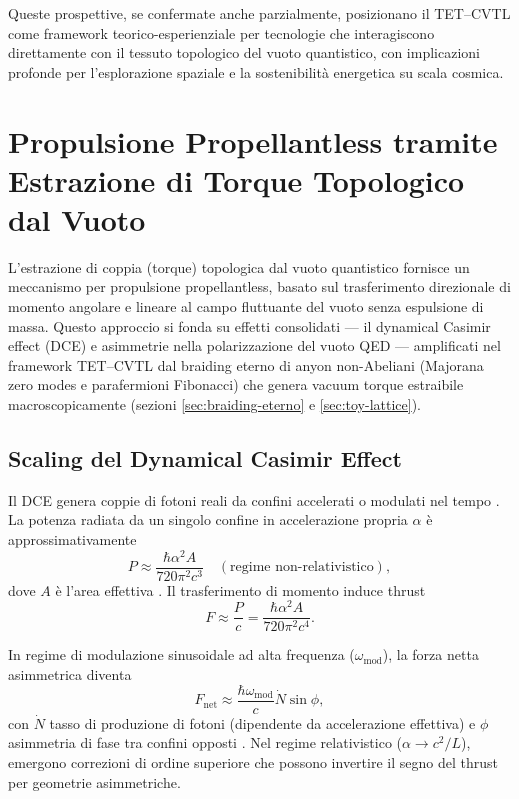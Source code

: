 \documentclass[11pt,a4paper]{article}
\let\oldcite\cite
\renewcommand{\cite}{\protect\oldcite}
\let\oldref\ref
\renewcommand{\ref}{\protect\oldref}
\theoremstyle{plain}
\theoremstyle{definition}
\begin{document}
\vspace{0.3cm}

Queste prospettive, se confermate anche parzialmente, posizionano il TET--CVTL come framework teorico-esperienziale per tecnologie che interagiscono direttamente con il tessuto topologico del vuoto quantistico, con implicazioni profonde per l'esplorazione spaziale e la sostenibilità energetica su scala cosmica.




\section{Propulsione Propellantless tramite Estrazione di Torque Topologico dal Vuoto}
\label{sec:propellantless-vacuum-torque}

L'estrazione di coppia (torque) topologica dal vuoto quantistico fornisce un meccanismo per propulsione propellantless, basato sul trasferimento direzionale di momento angolare e lineare al campo fluttuante del vuoto senza espulsione di massa. Questo approccio si fonda su effetti consolidati — il dynamical Casimir effect (DCE) e asimmetrie nella polarizzazione del vuoto QED — amplificati nel framework TET--CVTL dal braiding eterno di anyon non-Abeliani (Majorana zero modes e parafermioni Fibonacci) che genera vacuum torque estraibile macroscopicamente (sezioni \ref{sec:braiding-eterno} e \ref{sec:toy-lattice}).

\subsection{Scaling del Dynamical Casimir Effect}

Il DCE genera coppie di fotoni reali da confini accelerati o modulati nel tempo \cite{Moore1970, Wilson2011}. La potenza radiata da un singolo confine in accelerazione propria $\alpha$ è approssimativamente
\begin{equation}
P \approx \frac{\hbar \alpha^2 A}{720 \pi^2 c^3} \quad (\text{regime non-relativistico}),
\label{eq:dce_power}
\end{equation}
dove $A$ è l'area effettiva \cite{Maclay2007}. Il trasferimento di momento induce thrust
\begin{equation}
F \approx \frac{P}{c} = \frac{\hbar \alpha^2 A}{720 \pi^2 c^4}.
\label{eq:dce_thrust_basic}
\end{equation}

In regime di modulazione sinusoidale ad alta frequenza ($\omega_{\mathrm{mod}}$), la forza netta asimmetrica diventa
\begin{equation}
F_{\mathrm{net}} \approx \frac{\hbar \omega_{\mathrm{mod}}}{c} \dot{N} \sin\phi,
\label{eq:dce_net}
\end{equation}
con $\dot{N}$ tasso di produzione di fotoni (dipendente da accelerazione effettiva) e $\phi$ asimmetria di fase tra confini opposti \cite{PropDCE2025}. Nel regime relativistico ($\alpha \to c^2 / L$), emergono correzioni di ordine superiore che possono invertire il segno del thrust per geometrie asimmetriche.
\end{document}
